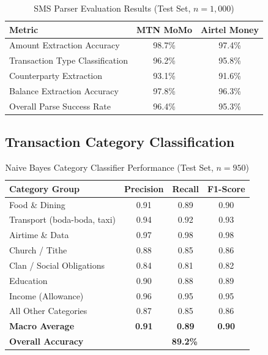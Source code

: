 \documentclass[12pt,a4paper]{report}
\begin{document}
\begin{table}[H]
\centering
\caption{SMS Parser Evaluation Results (Test Set, $n = 1{,}000$)}
\label{tab:sms_results}
\begin{tabular}{lcc}
\toprule
\textbf{Metric} & \textbf{MTN MoMo} & \textbf{Airtel Money} \\
\midrule
Amount Extraction Accuracy    & 98.7\% & 97.4\% \\
Transaction Type Classification & 96.2\% & 95.8\% \\
Counterparty Extraction       & 93.1\% & 91.6\% \\
Balance Extraction Accuracy   & 97.8\% & 96.3\% \\
Overall Parse Success Rate    & 96.4\% & 95.3\% \\
\bottomrule
\end{tabular}
\end{table}

\subsection{Transaction Category Classification}

\begin{table}[H]
\centering
\caption{Naive Bayes Category Classifier Performance (Test Set, $n = 950$)}
\label{tab:classifier_results}
\begin{tabular}{lccc}
\toprule
\textbf{Category Group} & \textbf{Precision} & \textbf{Recall} & \textbf{F1-Score} \\
\midrule
Food \& Dining            & 0.91 & 0.89 & 0.90 \\
Transport (boda-boda, taxi) & 0.94 & 0.92 & 0.93 \\
Airtime \& Data           & 0.97 & 0.98 & 0.98 \\
Church / Tithe            & 0.88 & 0.85 & 0.86 \\
Clan / Social Obligations & 0.84 & 0.81 & 0.82 \\
Education                 & 0.90 & 0.88 & 0.89 \\
Income (Allowance)        & 0.96 & 0.95 & 0.95 \\
All Other Categories      & 0.87 & 0.85 & 0.86 \\
\midrule
\textbf{Macro Average}    & \textbf{0.91} & \textbf{0.89} & \textbf{0.90} \\
\textbf{Overall Accuracy} & \multicolumn{3}{c}{\textbf{89.2\%}} \\
\bottomrule
\end{tabular}
\end{table}
\end{document}
